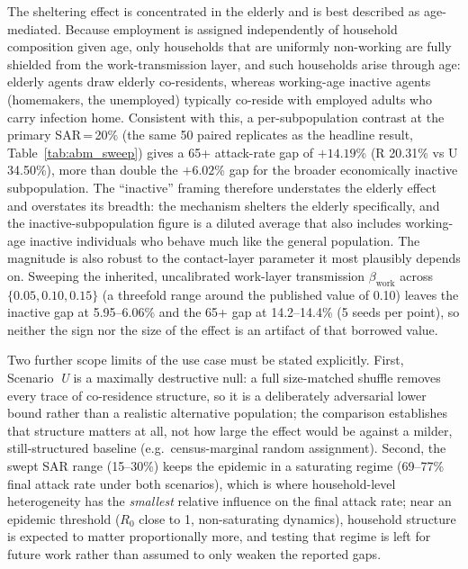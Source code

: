 \documentclass{article}
\begin{document}
The sheltering effect is concentrated in the elderly and is best described as age-mediated. Because employment is assigned independently of household composition given age, only households that are uniformly non-working are fully shielded from the work-transmission layer, and such households arise through age: elderly agents draw elderly co-residents, whereas working-age inactive agents (homemakers, the unemployed) typically co-reside with employed adults who carry infection home. Consistent with this, a per-subpopulation contrast at the primary SAR\,=\,20\% (the same 50 paired replicates as the headline result, Table~\ref{tab:abm_sweep}) gives a 65+ attack-rate gap of $+14.19$\% (R 20.31\% vs U 34.50\%), more than double the $+6.02$\% gap for the broader economically inactive subpopulation. The ``inactive'' framing therefore understates the elderly effect and overstates its breadth: the mechanism shelters the elderly specifically, and the inactive-subpopulation figure is a diluted average that also includes working-age inactive individuals who behave much like the general population. The magnitude is also robust to the contact-layer parameter it most plausibly depends on. Sweeping the inherited, uncalibrated work-layer transmission $\beta_\mathrm{work}$ across $\{0.05, 0.10, 0.15\}$ (a threefold range around the published value of 0.10) leaves the inactive gap at 5.95--6.06\% and the 65+ gap at 14.2--14.4\% (5 seeds per point), so neither the sign nor the size of the effect is an artifact of that borrowed value.

Two further scope limits of the use case must be stated explicitly. First, Scenario~\textit{U} is a maximally destructive null: a full size-matched shuffle removes every trace of co-residence structure, so it is a deliberately adversarial lower bound rather than a realistic alternative population; the comparison establishes that structure matters at all, not how large the effect would be against a milder, still-structured baseline (e.g.\ census-marginal random assignment). Second, the swept SAR range (15--30\%) keeps the epidemic in a saturating regime (69--77\% final attack rate under both scenarios), which is where household-level heterogeneity has the \emph{smallest} relative influence on the final attack rate; near an epidemic threshold ($R_0$ close to 1, non-saturating dynamics), household structure is expected to matter proportionally more, and testing that regime is left for future work rather than assumed to only weaken the reported gaps.
\end{document}
